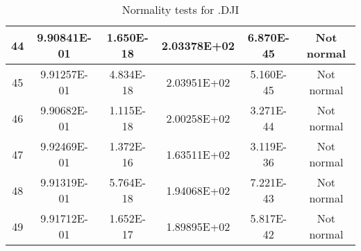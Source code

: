\begin{table}[h]
\begin{tabular}{|c|c|c|c|c|c|}
		44 & 9.90841E-01 & 1.650E-18 & 2.03378E+02 & 6.870E-45 & Not normal\\\hline
		45 & 9.91257E-01 & 4.834E-18 & 2.03951E+02 & 5.160E-45 & Not normal\\\hline
		46 & 9.90682E-01 & 1.115E-18 & 2.00258E+02 & 3.271E-44 & Not normal\\\hline
		47 & 9.92469E-01 & 1.372E-16 & 1.63511E+02 & 3.119E-36 & Not normal\\\hline
		48 & 9.91319E-01 & 5.764E-18 & 1.94068E+02 & 7.221E-43 & Not normal\\\hline
		49 & 9.91712E-01 & 1.652E-17 & 1.89895E+02 & 5.817E-42 & Not normal\\\hline
	\end{tabular}
	\caption{Normality tests for .DJI}
\end{table}
